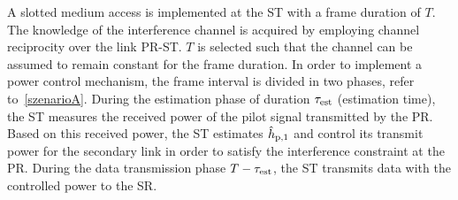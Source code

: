 A slotted medium access is implemented at the ST with a frame duration of $T$. The knowledge of the interference channel is acquired by employing channel reciprocity over the link PR-ST. $T$ is selected such that the channel can be assumed to remain constant for the frame duration. %
In order to implement a power control mechanism, the frame interval is divided in two phases, refer to\figurename~\ref{szenarioA}. During the estimation phase of duration $\tau_{\text{est}}$ (estimation time), the ST measures the received power of the pilot signal transmitted by the PR. Based on this received power, the ST estimates $\hat{h}_{\text{p,1}}$ and control its transmit power for the secondary link in order to satisfy the interference constraint at the PR. During the data transmission phase $T-\tau_{\text{est}}$, the ST transmits data with the controlled power to the SR.

